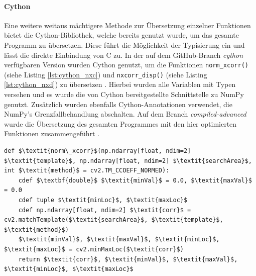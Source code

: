 \paragraph{Cython}

Eine weitere weitaus mächtigere Methode zur Übersetzung einzelner Funktionen bietet die Cython-Bibliothek, welche bereits genutzt wurde, um das gesamte Programm zu übersetzen. Diese führt die Möglichkeit der Typisierung ein und lässt die direkte Einbindung von C zu. In der auf dem GitHub-Branch \textit{cython} verfügbaren Version wurden Cython genutzt, um die Funktionen \texttt{norm\_xcorr()} (siehe Listing \ref{lst:cython_nxc}) und \texttt{nxcorr\_disp()} (siehe Listing \ref{lst:cython_nxd}) zu übersetzen \cite{Coj17}. Hierbei wurden alle Variablen mit Typen versehen und es wurde die von Cython bereitgestellte Schnittstelle zu NumPy genutzt. Zusätzlich wurden ebenfalls Cython-Annotationen verwendet, die NumPy's Grenzfallbehandlung abschalten. Auf dem Branch \textit{compiled-advanced} wurde die Übersetzung des gesamten Programmes mit den hier optimierten Funktionen zusammengeführt \cite{Coj17}. 

\begin{lstlisting}[caption={Die in Cython optimierte Funktion norm\_xcorr()}, label={lst:cython_nxc}]
def $\textit{norm\_xcorr}$(np.ndarray[float, ndim=2] $\textit{template}$, np.ndarray[float, ndim=2] $\textit{searchArea}$, int $\textit{method}$ = cv2.TM_CCOEFF_NORMED):
	cdef $\textbf{double}$ $\textit{minVal}$ = 0.0, $\textit{maxVal}$ = 0.0
	cdef tuple $\textit{minLoc}$, $\textit{maxLoc}$
	cdef np.ndarray[float, ndim=2] $\textit{corr}$ = cv2.matchTemplate($\textit{searchArea}$, $\textit{template}$, $\textit{method}$)
	$\textit{minVal}$, $\textit{maxVal}$, $\textit{minLoc}$, $\textit{maxLoc}$ = cv2.minMaxLoc($\textit{corr}$)
	return $\textit{corr}$, $\textit{minVal}$, $\textit{maxVal}$, $\textit{minLoc}$, $\textit{maxLoc}$
\end{lstlisting}


